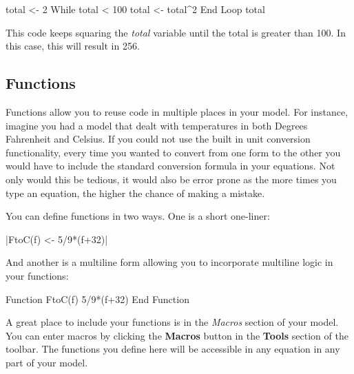\documentclass[]{memoir}
\newenvironment{Shaded}{}{}
\newcommand{\DecValTok}[1]{\textcolor[rgb]{0.25,0.63,0.44}{{#1}}}
\newcommand{\FunctionTok}[1]{\textcolor[rgb]{0.02,0.16,0.49}{{#1}}}
\newcommand{\NormalTok}[1]{{#1}}
\renewcommand{\u}[1]{\textbf{#1}}
\begin{document}
\begin{Shaded}
\begin{Highlighting}[]
\NormalTok{total <- }\DecValTok{2}
\NormalTok{While total < }\DecValTok{100}
    \NormalTok{total <- total^}\DecValTok{2}
\NormalTok{End Loop}
\NormalTok{total}
\end{Highlighting}
\end{Shaded}

This code keeps squaring the \emph{total} variable until the total is
greater than 100. In this case, this will result in 256.

\subsection{Functions}

Functions allow you to reuse code in multiple places in your model. For
instance, imagine you had a model that dealt with temperatures in both
Degrees Fahrenheit and Celsius. If you could not use the built in unit
conversion functionality, every time you wanted to convert from one form
to the other you would have to include the standard conversion formula
in your equations. Not only would this be tedious, it would also be
error prone as the more times you type an equation, the higher the
chance of making a mistake.

You can define functions in two ways. One is a short one-liner:

|\FunctionTok{FtoC}\NormalTok{(f) <- }\DecValTok{5}\NormalTok{/}\DecValTok{9}\NormalTok{*(f}\DecValTok{+32}\NormalTok{)}|

And another is a multiline form allowing you to incorporate multiline
logic in your functions:

\begin{Shaded}
\begin{Highlighting}[]
\NormalTok{Function }\FunctionTok{FtoC}\NormalTok{(f)}
    \DecValTok{5}\NormalTok{/}\DecValTok{9}\NormalTok{*(f}\DecValTok{+32}\NormalTok{)}
\NormalTok{End Function}
\end{Highlighting}
\end{Shaded}

A great place to include your functions is in the \emph{Macros} section
of your model. You can enter macros by clicking the \u{Macros} button in
the \u{Tools} section of the toolbar. The functions you define here will
be accessible in any equation in any part of your model.

\end{document}

